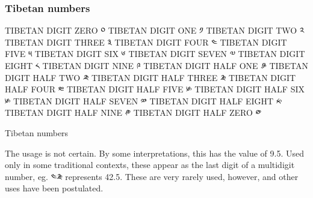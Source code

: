 \subsubsection{Tibetan numbers}

{
\obeylines
\small
TIBETAN DIGIT ZERO	༠
TIBETAN DIGIT ONE	༡	
TIBETAN DIGIT TWO	༢	
TIBETAN DIGIT THREE	༣	
TIBETAN DIGIT FOUR	༤	
TIBETAN DIGIT FIVE	༥	
TIBETAN DIGIT SIX	༦	
TIBETAN DIGIT SEVEN	༧	
TIBETAN DIGIT EIGHT	༨	
TIBETAN DIGIT NINE	༩	
TIBETAN DIGIT HALF ONE	\tibetan༪	
TIBETAN DIGIT HALF TWO	༫	
TIBETAN DIGIT HALF THREE	༬
TIBETAN DIGIT HALF FOUR ༭	
TIBETAN DIGIT HALF FIVE ༯	
TIBETAN DIGIT HALF SIX	 ༯	
TIBETAN DIGIT HALF SEVEN	༰	
TIBETAN DIGIT HALF EIGHT	༱	
TIBETAN DIGIT HALF NINE	༲	
TIBETAN DIGIT HALF ZERO	༳	
}


Tibetan numbers

The usage is not certain. By some interpretations, this has the value of 9.5. Used only in some traditional contexts, these appear as the last digit of a multidigit number, eg. ༤༬ represents 42.5. These are very rarely used, however, and other uses have been postulated.




